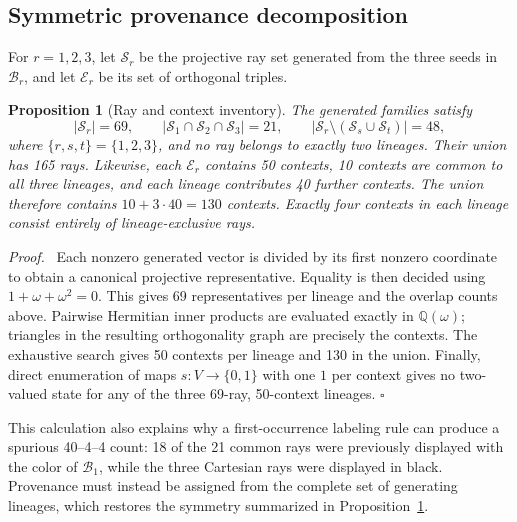 \documentclass[%
  reprint,
  superscriptaddress,
  showpacs,
  showkeys,
  amsmath,amssymb,
  pra,
  longbibliography,
  floatfix,
  x11names
]{revtex4-2}
\newenvironment{revision}{\begingroup\color{revisionblue}}{\endgroup}
\newtheorem{proposition}{Proposition}
\newenvironment{proof}{\par\noindent\textit{Proof.}\ }{\hfill$\square$\par}
\begin{document}
\begin{revision}
\subsection{Symmetric provenance decomposition}

For $r=1,2,3$, let $\mathcal{S}_r$ be the projective ray set generated from the three seeds in $\mathcal{B}_r$, and let $\mathcal{E}_r$ be its set of orthogonal triples.

\begin{proposition}[Ray and context inventory]
\label{prop:provenance}
The generated families satisfy
\[
|\mathcal{S}_r|=69,\qquad
|\mathcal{S}_1\cap\mathcal{S}_2\cap\mathcal{S}_3|=21,
\qquad |\mathcal{S}_r\setminus(\mathcal{S}_s\cup\mathcal{S}_t)|=48,
\]
where $\{r,s,t\}=\{1,2,3\}$, and no ray belongs to exactly two lineages.  Their union has 165 rays.  Likewise, each $\mathcal{E}_r$ contains 50 contexts, 10 contexts are common to all three lineages, and each lineage contributes 40 further contexts.  The union therefore contains $10+3\cdot40=130$ contexts.  Exactly four contexts in each lineage consist entirely of lineage-exclusive rays.
\end{proposition}

\begin{proof}
Each nonzero generated vector is divided by its first nonzero coordinate to obtain a canonical projective representative.  Equality is then decided using $1+\omega+\omega^2=0$.  This gives 69 representatives per lineage and the overlap counts above.  Pairwise Hermitian inner products are evaluated exactly in $\mathbb{Q}(\omega)$; triangles in the resulting orthogonality graph are precisely the contexts.  The exhaustive search gives 50 contexts per lineage and 130 in the union.  Finally, direct enumeration of maps $s:V\to\{0,1\}$ with one $1$ per context gives no two-valued state for any of the three 69-ray, 50-context lineages.
\end{proof}

This calculation also explains why a first-occurrence labeling rule can produce a spurious 40--4--4 count: 18 of the 21 common rays were previously displayed with the color of $\mathcal{B}_1$, while the three Cartesian rays were displayed in black.  Provenance must instead be assigned from the complete set of generating lineages, which restores the symmetry summarized in Proposition~\ref{prop:provenance}.
\end{revision}


\end{document}
